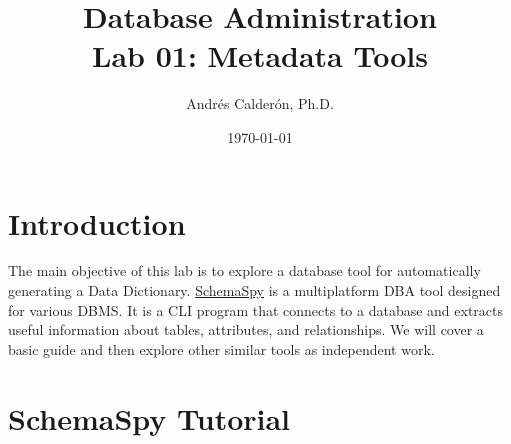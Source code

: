 \documentclass{article}
\title{Database Administration \\ Lab 01: Metadata Tools}
\author{Andrés Calderón, Ph.D.}
\date{\today}
\begin{document}
\maketitle

\section{Introduction}
The main objective of this lab is to explore a database tool for automatically generating a Data Dictionary. \href{https://schemaspy.org/}{SchemaSpy} is a multiplatform DBA tool designed for various DBMS. It is a CLI program that connects to a database and extracts useful information about tables, attributes, and relationships. We will cover a basic guide and then explore other similar tools as independent work.

\section{SchemaSpy Tutorial}
\end{document}
